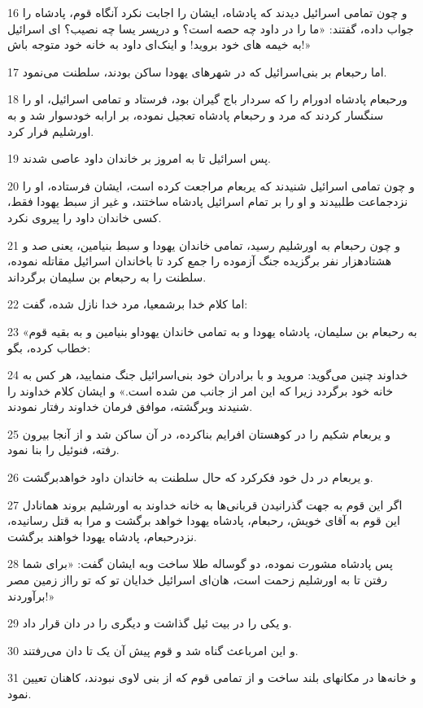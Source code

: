 \par 16 و چون تمامی اسرائیل دیدند که پادشاه، ایشان را اجابت نکرد آنگاه قوم، پادشاه را جواب داده، گفتند: «ما را در داود چه حصه است؟ و درپسر یسا چه نصیب؟ ای اسرائیل به خیمه های خود بروید! و اینک‌ای داود به خانه خود متوجه باش!»
\par 17 اما رحبعام بر بنی‌اسرائیل که در شهرهای یهودا ساکن بودند، سلطنت می‌نمود.
\par 18 ورحبعام پادشاه ادورام را که سردار باج گیران بود، فرستاد و تمامی اسرائیل، او را سنگسار کردند که مرد و رحبعام پادشاه تعجیل نموده، بر ارابه خودسوار شد و به اورشلیم فرار کرد.
\par 19 پس اسرائیل تا به امروز بر خاندان داود عاصی شدند.
\par 20 و چون تمامی اسرائیل شنیدند که یربعام مراجعت کرده است، ایشان فرستاده، او را نزدجماعت طلبیدند و او را بر تمام اسرائیل پادشاه ساختند، و غیر از سبط یهودا فقط، کسی خاندان داود را پیروی نکرد.
\par 21 و چون رحبعام به اورشلیم رسید، تمامی خاندان یهودا و سبط بنیامین، یعنی صد و هشتادهزار نفر برگزیده جنگ آزموده را جمع کرد تا باخاندان اسرائیل مقاتله نموده، سلطنت را به رحبعام بن سلیمان برگرداند.
\par 22 اما کلام خدا برشمعیا، مرد خدا نازل شده، گفت:
\par 23 «به رحبعام بن سلیمان، پادشاه یهودا و به تمامی خاندان یهوداو بنیامین و به بقیه قوم خطاب کرده، بگو:
\par 24 خداوند چنین می‌گوید: مروید و با برادران خود بنی‌اسرائیل جنگ منمایید، هر کس به خانه خود برگردد زیرا که این امر از جانب من شده است.» و ایشان کلام خداوند را شنیدند وبرگشته، موافق فرمان خداوند رفتار نمودند.
\par 25 و یربعام شکیم را در کوهستان افرایم بناکرده، در آن ساکن شد و از آنجا بیرون رفته، فنوئیل را بنا نمود.
\par 26 و یربعام در دل خود فکرکرد که حال سلطنت به خاندان داود خواهدبرگشت. 
\par 27 اگر این قوم به جهت گذرانیدن قربانی‌ها به خانه خداوند به اورشلیم بروند همانادل این قوم به آقای خویش، رحبعام، پادشاه یهودا خواهد برگشت و مرا به قتل رسانیده، نزدرحبعام، پادشاه یهودا خواهند برگشت.
\par 28 پس پادشاه مشورت نموده، دو گوساله طلا ساخت وبه ایشان گفت: «برای شما رفتن تا به اورشلیم زحمت است، هان‌ای اسرائیل خدایان تو که تو رااز زمین مصر برآوردند!»
\par 29 و یکی را در بیت ئیل گذاشت و دیگری را در دان قرار داد.
\par 30 و این امرباعث گناه شد و قوم پیش آن یک تا دان می‌رفتند.
\par 31 و خانه‌ها در مکانهای بلند ساخت و از تمامی قوم که از بنی لاوی نبودند، کاهنان تعیین نمود.
